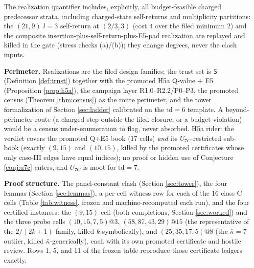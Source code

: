 \documentclass[11pt]{article}
\theoremstyle{definition}
\theoremstyle{remark}
\newcommand{\kb}{\bar\kappa}
\begin{document}
The realization quantifier includes, explicitly, all budget-feasible charged predecessor strata, including charged-state self-returns and multiplicity partitions: the $(21,9)$ $l=3$ self-return at $(2/3,3)$ (cost $4$ over the filed minimum $2$) and the composite insertion-plus-self-return-plus-E5-pad realization are replayed and killed in the gate (stress checks (a)/(b)); they change degrees, never the clash inputs.

\medskip
\noindent\textbf{Perimeter.} Realizations are the filed design families; the trust set is $\mathsf{S}$ (Definition \ref{def:trust}) together with the promoted H5a Q-value $+$ E5 (Proposition \ref{prop:h5a}), the campaign layer R1.0--R2.2/P0--P3, the promoted census (Theorem \ref{thm:census}) as the route perimeter, and the tower formalization of Section \ref{sec:ladder} calibrated on the $\mathrm{td}=6$ template. A beyond-perimeter route (a charged step outside the filed closure, or a budget violation) would be a census under-enumeration to flag, never absorbed. H5a rider: the verdict covers the promoted Q$+$E5 book (17 cells) \emph{and} its $U_{7C}$-restricted sub-book (exactly $(9,15)$ and $(10,15)$, killed by the promoted certificates whose only case-III edges have equal indices); no proof or hidden use of Conjecture \ref{conj:u7c} enters, and $U_{7C}$ is moot for $\mathrm{td}=7$.

\medskip
\noindent\textbf{Proof structure.} The panel-constant clash (Section \ref{sec:tower}), the four lemmas (Section \ref{sec:lemmas}), a per-cell witness row for each of the 16 class-C cells (Table \ref{tab:witness}, frozen and machine-recomputed each run), and the four certified instances: the $(9,15)$ cell (both completions, Section \ref{sec:worked}) and the three probe cells $(10,15,7,5)@3$, $(58,87,43,29)@15$ (the representative of the $2/(2k+1)$ family, killed $k$-symbolically), and $(25,35,17,5)@8$ (the $\kb=7$ outlier, killed $\kb$-generically), each with its own promoted certificate and hostile review. Rows 1, 5, and 11 of the frozen table reproduce those certificate ledgers exactly.
\end{document}
